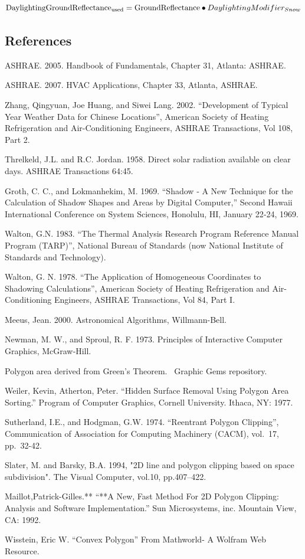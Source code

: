 \begin{equation}
{\rm{DaylightingGroundReflectanc}}{{\rm{e}}_{{\rm{used}}}} = {\rm{GroundReflectance}} \bullet DaylightingModifie{r_{Snow}}
\end{equation}

\subsection{References}\label{references-041}

ASHRAE. 2005. Handbook of Fundamentals, Chapter 31, Atlanta: ASHRAE.

ASHRAE. 2007. HVAC Applications, Chapter 33, Atlanta, ASHRAE.

Zhang, Qingyuan, Joe Huang, and Siwei Lang. 2002. ``Development of Typical Year Weather Data for Chinese Locations'', American Society of Heating Refrigeration and Air-Conditioning Engineers, ASHRAE Transactions, Vol 108, Part 2.

Threlkeld, J.L. and R.C. Jordan. 1958. Direct solar radiation available on clear days. ASHRAE Transactions 64:45.

Groth, C. C., and Lokmanhekim, M. 1969. ``Shadow ‑ A New Technique for the Calculation of Shadow Shapes and Areas by Digital Computer,'' Second Hawaii International Conference on System Sciences, Honolulu, HI, January 22‑24, 1969.

Walton, G.N. 1983. ``The Thermal Analysis Research Program Reference Manual Program (TARP)'', National Bureau of Standards (now National Institute of Standards and Technology).

Walton, G. N. 1978. ``The Application of Homogeneous Coordinates to Shadowing Calculations'', American Society of Heating Refrigeration and Air-Conditioning Engineers, ASHRAE Transactions, Vol 84, Part I.

Meeus, Jean. 2000. Astronomical Algorithms, Willmann-Bell.

Newman, M. W., and Sproul, R. F. 1973. Principles of Interactive Computer Graphics, McGraw‑Hill.

Polygon area derived from Green's Theorem.~ Graphic Gems repository.

Weiler, Kevin, Atherton, Peter. ``Hidden Surface Removal Using Polygon Area Sorting.'' Program of Computer Graphics, Cornell University. Ithaca, NY: 1977.

Sutherland, I.E., and Hodgman, G.W. 1974. ``Reentrant Polygon Clipping'', Communication of Association for Computing Machinery (CACM), vol.~17, pp.~32-42.

Slater, M. and Barsky, B.A. 1994, "2D line and polygon clipping based on space subdivision". The Visual Computer, vol.10, pp.407–422.

Maillot,Patrick-Gilles.** ``**A New, Fast Method For 2D Polygon Clipping: Analysis and Software Implementation.'' Sun Microsystems, inc. Mountain View, CA: 1992.

Wisstein, Eric W. ``Convex Polygon'' From Mathworld- A Wolfram Web Resource.
